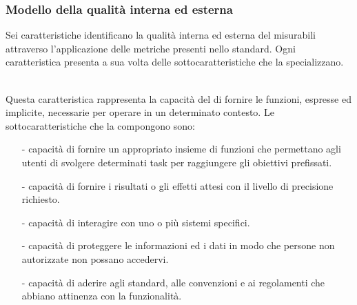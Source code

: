 \documentclass[a4paper, titlepage]{article}
\begin{document}
\subsubsection{Modello della qualità interna ed esterna}
Sei caratteristiche identificano la qualità interna ed esterna del  misurabili attraverso l'applicazione delle metriche presenti nello standard. Ogni caratteristica presenta a sua volta delle sottocaratteristiche che la specializzano.
\\
\begin{description}
\item {}
\\ Questa caratteristica rappresenta la capacità del  di fornire le funzioni, espresse ed implicite, necessarie per operare in un determinato contesto. 
\newline Le sottocaratteristiche che la compongono sono:
\begin{itemize}
\item[-] capacità di fornire un appropriato insieme di funzioni che permettano agli utenti di svolgere determinati task per raggiungere gli obiettivi prefissati.
\item[-] capacità di fornire i risultati o gli effetti attesi con il livello di precisione richiesto.
\item[-] capacità di interagire con uno o più sistemi specifici.
\item[-] capacità di proteggere le informazioni ed i dati in modo che persone non autorizzate non possano accedervi.
\item[-] capacità di aderire agli standard, alle convenzioni e ai regolamenti che abbiano attinenza con la funzionalità.
\\
\end{itemize}


\end{description}
\end{document}

